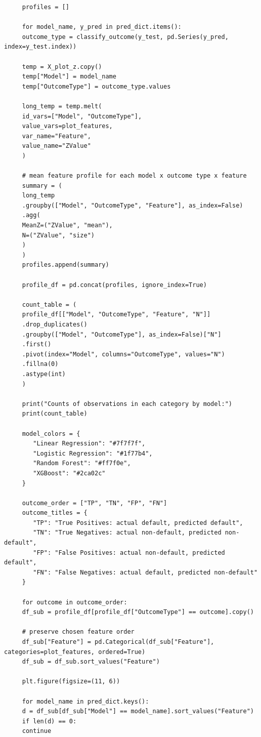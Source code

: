 \documentclass[letterpaper]{article}
\begin{document}
\begin{lstlisting}
     profiles = []
     
     for model_name, y_pred in pred_dict.items():
     outcome_type = classify_outcome(y_test, pd.Series(y_pred, index=y_test.index))
     
     temp = X_plot_z.copy()
     temp["Model"] = model_name
     temp["OutcomeType"] = outcome_type.values
     
     long_temp = temp.melt(
     id_vars=["Model", "OutcomeType"],
     value_vars=plot_features,
     var_name="Feature",
     value_name="ZValue"
     )
     
     # mean feature profile for each model x outcome type x feature
     summary = (
     long_temp
     .groupby(["Model", "OutcomeType", "Feature"], as_index=False)
     .agg(
     MeanZ=("ZValue", "mean"),
     N=("ZValue", "size")
     )
     )
     profiles.append(summary)
     
     profile_df = pd.concat(profiles, ignore_index=True)
     
     count_table = (
     profile_df[["Model", "OutcomeType", "Feature", "N"]]
     .drop_duplicates()
     .groupby(["Model", "OutcomeType"], as_index=False)["N"]
     .first()
     .pivot(index="Model", columns="OutcomeType", values="N")
     .fillna(0)
     .astype(int)
     )
     
     print("Counts of observations in each category by model:")
     print(count_table)
     
     model_colors = {
     	"Linear Regression": "#7f7f7f",
     	"Logistic Regression": "#1f77b4",
     	"Random Forest": "#ff7f0e",
     	"XGBoost": "#2ca02c"
     }
     
     outcome_order = ["TP", "TN", "FP", "FN"]
     outcome_titles = {
     	"TP": "True Positives: actual default, predicted default",
     	"TN": "True Negatives: actual non-default, predicted non-default",
     	"FP": "False Positives: actual non-default, predicted default",
     	"FN": "False Negatives: actual default, predicted non-default"
     }
     
     for outcome in outcome_order:
     df_sub = profile_df[profile_df["OutcomeType"] == outcome].copy()
     
     # preserve chosen feature order
     df_sub["Feature"] = pd.Categorical(df_sub["Feature"], categories=plot_features, ordered=True)
     df_sub = df_sub.sort_values("Feature")
     
     plt.figure(figsize=(11, 6))
     
     for model_name in pred_dict.keys():
     d = df_sub[df_sub["Model"] == model_name].sort_values("Feature")
     if len(d) == 0:
     continue
     

\end{lstlisting}
\end{document}
